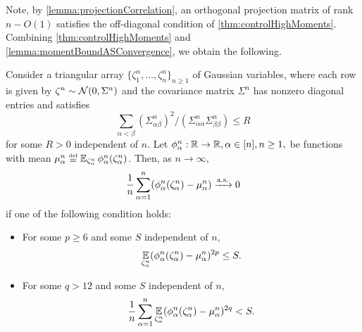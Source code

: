 \documentclass[main.tex]{subfiles}
\begin{document}
Note, by \cref{lemma:projectionCorrelation}, an orthogonal projection matrix of rank $n - O(1)$ satisfies the off-diagonal condition of \cref{thm:controlHighMoments}.
Combining \cref{thm:controlHighMoments} and \cref{lemma:momentBoundASConvergence}, we obtain the following.
\begin{cor}
  \label{thm:StrongLLNGaussianImage} Consider a triangular array $\{\zeta_{1}^{n},\ldots,\zeta_{n}^{n}\}_{n\ge1}$ of Gaussian variables, where each row is given by $\zeta^{n}\sim\mathcal{N}(0,\Sigma^{n})$ and the covariance matrix $\Sigma^{n}$ has nonzero diagonal entries and satisfies
  \[\sum_{\alpha<\beta}(\Sigma_{\alpha\beta}^{n})^{2} / (\Sigma_{\alpha\alpha}^n \Sigma_{\beta\beta}^n)\le R\]
  for some $R > 0$ independent of $n$.
  Let $\phi^n_\alpha:\mathbb{R}\to\mathbb{R}, \alpha\in[n], n \ge1,$ be functions with mean $\mu_\alpha^n \defeq \EV_{\zeta_\alpha^n} \phi^n_\alpha(\zeta^n_\alpha)$.
  Then, as $n\to\infty$,
  \begin{align*}
    \frac{1}{n} \sum_{\alpha=1}^n (\phi^n_\alpha(\zeta^n_\alpha) - \mu^n_\alpha) \xrightarrow{\mathrm{a.s.}} 0
  \end{align*}
  if one of the following condition holds:
  \begin{itemize}
    \item For some $p \ge 6$ and some $S$ independent of $n$,
    \[\operatorname*{\mathbb{E}}_{\zeta^n_\alpha} (\phi^n_\alpha(\zeta^n_\alpha) - \mu^n_\alpha)^{2p} \le S.\]
    \item For some $q > 12$ and some $S$ independent of $n$,
    \[\frac{1}{n} \sum_{\alpha=1}^n \operatorname*{\mathbb{E}}_{\zeta^n_\alpha} (\phi^n_\alpha(\zeta^n_\alpha) - \mu^n_\alpha)^{2q} < S.\]
  \end{itemize}

 \end{cor}
\end{document}
